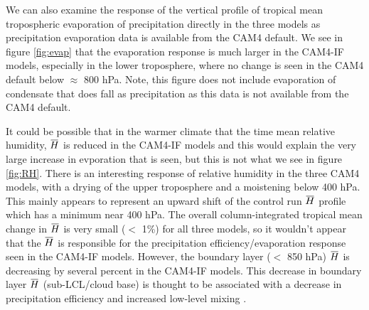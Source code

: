 \documentclass[letterpaper,12pt,titlepage,oneside,final]{book}
\newcommand{\overbar}[1]{\mkern 1.5mu\overline{\mkern-1.5mu#1\mkern-1.5mu}\mkern 1.5mu}
\begin{document}
We can also examine the response of the vertical profile of tropical mean tropospheric evaporation of precipitation directly in the three models as precipitation evaporation data is available from the CAM4 default. We see in figure \ref{fig:evap} that the evaporation response is much larger in the CAM4-IF models, especially in the lower troposphere, where no change is seen in the CAM4 default below $\approx$ 800 hPa. Note, this figure does not include evaporation of condensate that does fall as precipitation as this data is not available from the CAM4 default.

It could be possible that in the warmer climate that the time mean relative humidity, $\overbar{H}$ is reduced in the CAM4-IF models and this would explain the very large increase in evporation that is seen, but this is not what we see in figure \ref{fig:RH}. There is an interesting response of relative humidity in the three CAM4 models, with a drying of the upper troposphere and a moistening below 400 hPa. This mainly appears to represent an upward shift of the control run $\overbar{H}$  profile which has a minimum near 400 hPa. The overall column-integrated tropical mean change in $\overbar{H}$ is very small ($<$ 1\%) for all three models, so it wouldn't appear that the $\overbar{H}$  is responsible for the precipitation efficiency/evaporation response seen in the CAM4-IF models. However, the boundary layer ($<$ 850 hPa) $\overbar{H}$  is decreasing by several percent in the CAM4-IF models. This decrease in boundary layer $\overbar{H}$ (sub-LCL/cloud base) is thought to be associated with a decrease in precipitation efficiency \citep{market_precipitation_2003,sherwood_spread_2014} and increased low-level mixing \citep{sherwood_spread_2014}. 
\end{document}
